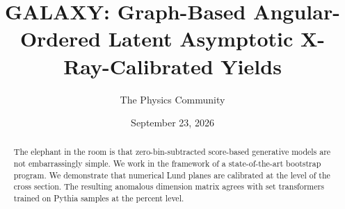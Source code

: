 \documentclass[11pt]{article}
\title{GALAXY: Graph-Based Angular-Ordered Latent Asymptotic X-Ray-Calibrated Yields}
\author{The Physics Community}
\date{September 23, 2026}
\numberwithin{equation}{section}
\theoremstyle{definition}
\theoremstyle{remark}
\begin{document}
\maketitle
\begin{abstract}
The elephant in the room is that zero-bin-subtracted score-based
generative models are not embarrassingly simple. We work in the
framework of a state-of-the-art bootstrap program. We demonstrate that
numerical Lund planes are calibrated at the level of the cross section.
The resulting anomalous dimension matrix agrees with set transformers
trained on Pythia samples at the percent level.
\end{abstract}
\tableofcontents





\nocite{*}


\end{document}
